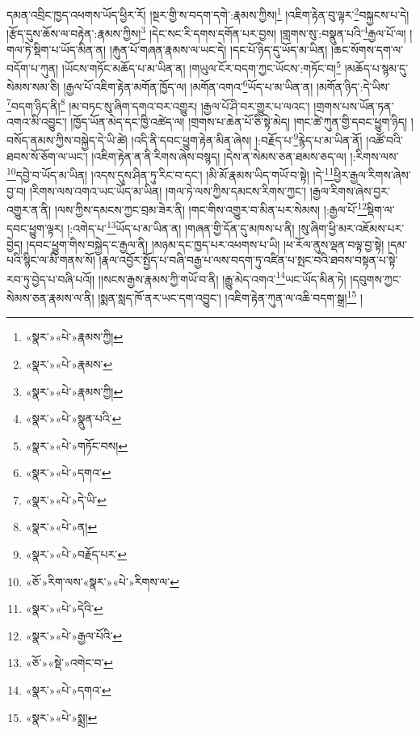 དམན་འབྲིང་ཁྱད་འཕགས་ཡོད་ཕྱིར་རོ། །སྔར་གྱི་ས་བདག་དགེ་:རྣམས་ཀྱིས།\footnote{«སྣར་»«པེ་»རྣམས་ཀྱི།} །འཇིག་རྟེན་བུ་ལྟར་\footnote{«སྣར་»«པེ་»རྣམས་}བསྐྱངས་པ་དེ། །རྩོད་དུས་ཆོས་ལ་བརྟེན་:རྣམས་ཀྱིས།\footnote{«སྣར་»«པེ་»རྣམས་ཀྱི།} །དེང་སང་རི་དགས་དགོན་པར་བྱས། །གླགས་སུ་:བསྣུན་པའི་\footnote{«སྣར་»«པེ་»སྣུན་པའི་}རྒྱལ་པོ་ལ། །གལ་ཏེ་སྡིག་པ་ཡོད་མིན་ན། །རྐུན་པོ་གཞན་རྣམས་ལ་ཡང་དེ། །དང་པོ་ཉིད་དུ་ཡོད་མ་ཡིན། །ཆང་སོགས་དག་ལ་བདོག་པ་ཀུན། །ཡོངས་གཏོང་མཆོད་པ་མ་ཡིན་ན། །གཡུལ་ངོར་བདག་ཀྱང་ཡོངས་:གཏོང་བ།\footnote{«སྣར་»«པེ་»གཏོང་བས།} །མཆོད་པ་སྙམ་དུ་སེམས་སམ་ཅི། །རྒྱལ་པོ་འཇིག་རྟེན་མགོན་ཁྱོད་ལ། །མགོན་འགའ་\footnote{«སྣར་»«པེ་»དགའ་}ཡོད་པ་མ་ཡིན་ན། །མགོན་ཉིད་:དེ་ཡིས་\footnote{«སྣར་»«པེ་»དེ་ཡི་}བདག་ཉིད་ནི།\footnote{«སྣར་»«པེ་»ན།} །མ་བཏང་སུ་ཞིག་དགའ་བར་འགྱུར། །རྒྱལ་པོ་ཤི་བར་གྱུར་པ་ལའང་། །གྲགས་པས་ཡོན་ཏན་འགའ་མི་འབྱུང་། །ཁྱོད་ཡོན་མེད་དང་ཁྱི་འཚེད་ལ། །གྲགས་པ་ཆེན་པོ་ཅི་སྟེ་མེད། །གང་ཚེ་ཀུན་གྱི་དབང་ཕྱུག་ཉིད། །བསོད་ནམས་ཀྱིས་བསྐྱེད་དེ་ཡི་ཚེ། །འདི་ནི་དབང་ཕྱུག་རྟེན་མིན་ཞེས། །:བརྗོད་པ་\footnote{«སྣར་»«པེ་»བརྗོད་པར་}རྙེད་པ་མ་ཡིན་ནོ། །འཚོ་བའི་ཐབས་སོ་ཅོག་ལ་ཡང་། །འཇིག་རྟེན་ན་ནི་རིགས་ཞེས་བསྙད། །དེས་ན་སེམས་ཅན་ཐམས་ཅད་ལ། །:རིགས་ལས་\footnote{«ཅོ་»རིག་ལས་«སྣར་»«པེ་»རིགས་ལ་}དབྱེ་བ་ཡོད་མ་ཡིན། །འདས་དུས་ཤིན་ཏུ་རིང་བ་དང་། །མི་མོ་རྣམས་ཡིད་གཡོ་བ་སྟེ། །དེ་\footnote{«སྣར་»«པེ་»དེའི་}ཕྱིར་རྒྱལ་རིགས་ཞེས་བྱ་བ། །རིགས་ལས་འགའ་ཡང་ཡོད་མ་ཡིན། །གལ་ཏེ་ལས་ཀྱིས་དམངས་རིགས་ཀྱང་། །རྒྱལ་རིགས་ཞེས་བྱར་འགྱུར་ན་ནི། །ལས་ཀྱིས་དམངས་ཀྱང་བྲམ་ཟེར་ནི། །གང་གིས་འགྱུར་བ་མིན་པར་སེམས། །:རྒྱལ་པོ་\footnote{«སྣར་»«པེ་»རྒྱལ་པོའི་}སྡིག་ལ་དབང་ཕྱུག་ལྟར། །:འགེད་པ་\footnote{«ཅོ་»«སྡེ་»འགེང་བ་}ཡོད་པ་མ་ཡིན་ན། །གཞན་གྱི་དོན་དུ་མཁས་པ་ནི། །སུ་ཞིག་ཕྱི་མར་འཇོམས་པར་བྱེད། །དབང་ཕྱུག་གིས་བསྐྱེད་ང་རྒྱལ་ནི། །མཉམ་དང་ཁྱད་པར་འཕགས་པ་ཡི། །ཕ་རོལ་ནུས་ལྡན་བལྟ་བྱ་སྟེ། །དམ་པའི་སྙིང་ལ་མི་གནས་སོ། །རྣལ་འབྱོར་སྤྱོད་པ་བཞི་བརྒྱ་པ་ལས་བདག་ཏུ་འཛིན་པ་སྤང་བའི་ཐབས་བསྟན་པ་སྟེ་རབ་ཏུ་བྱེད་པ་བཞི་པའོ།། །།སངས་རྒྱས་རྣམས་ཀྱི་གཡོ་བ་ནི། །རྒྱུ་མེད་འགའ་\footnote{«སྣར་»«པེ་»དགའ་}ཡང་ཡོད་མིན་ཏེ། །དབུགས་ཀྱང་སེམས་ཅན་རྣམས་ལ་ནི། །སྨན་སླད་ཁོ་ནར་ཡང་དག་འབྱུང་། །འཇིག་རྟེན་ཀུན་ལ་འཆི་བདག་སྒྲ།\footnote{«སྣར་»«པེ་»སྨྲ།} །
